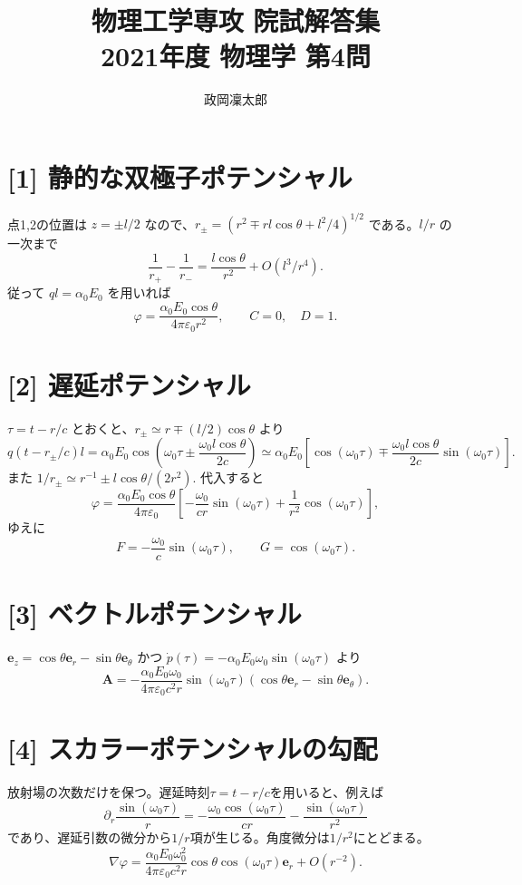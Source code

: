 \documentclass[11pt,a4paper]{article}
\title{物理工学専攻 院試解答集\\2021年度 物理学 第4問}
\author{政岡凜太郎}
\date{}
\begin{document}
\maketitle

\section*{[1] 静的な双極子ポテンシャル}
点1,2の位置は $z=\pm l/2$ なので、$r_\pm=(r^2\mp rl\cos\theta+l^2/4)^{1/2}$ である。$l/r$ の一次まで
\[
\frac1{r_+}-\frac1{r_-}=\frac{l\cos\theta}{r^2}+O(l^3/r^4).
\]
従って $q l=\alpha_0E_0$ を用いれば
\[
\varphi=\frac{\alpha_0E_0\cos\theta}{4\pi\varepsilon_0r^2},\qquad
\boxed{C=0,\quad D=1}.
\]

\section*{[2] 遅延ポテンシャル}
$\tau=t-r/c$ とおくと、$r_\pm\simeq r\mp(l/2)\cos\theta$ より
\[
q(t-r_\pm/c)l=\alpha_0E_0\cos\!\left(\omega_0\tau\pm\frac{\omega_0l\cos\theta}{2c}\right)
\simeq \alpha_0E_0\left[\cos(\omega_0\tau)\mp\frac{\omega_0l\cos\theta}{2c}\sin(\omega_0\tau)\right].
\]
また $1/r_\pm\simeq r^{-1}\pm l\cos\theta/(2r^2)$. 代入すると
\[
\varphi=\frac{\alpha_0E_0\cos\theta}{4\pi\varepsilon_0}
\left[ -\frac{\omega_0}{cr}\sin(\omega_0\tau)+\frac1{r^2}\cos(\omega_0\tau)\right],
\]
ゆえに
\[
\boxed{F=-\frac{\omega_0}{c}\sin(\omega_0\tau),\qquad G=\cos(\omega_0\tau)}.
\]

\section*{[3] ベクトルポテンシャル}
$\boldsymbol e_z=\cos\theta\boldsymbol e_r-\sin\theta\boldsymbol e_\theta$ かつ $\dot p(\tau)=-\alpha_0E_0\omega_0\sin(\omega_0\tau)$ より
\[
\boxed{\boldsymbol A=-\frac{\alpha_0E_0\omega_0}{4\pi\varepsilon_0c^2r}\sin(\omega_0\tau)
(\cos\theta\boldsymbol e_r-\sin\theta\boldsymbol e_\theta)}.
\]

\section*{[4] スカラーポテンシャルの勾配}
放射場の次数だけを保つ。遅延時刻$\tau=t-r/c$を用いると、例えば
\begin{equation}
 \partial_r\frac{\sin(\omega_0\tau)}r
 =-\frac{\omega_0\cos(\omega_0\tau)}{cr}
 -\frac{\sin(\omega_0\tau)}{r^2}
\end{equation}
であり、遅延引数の微分から$1/r$項が生じる。角度微分は$1/r^2$にとどまる。
\[
\boxed{\nabla\varphi=\frac{\alpha_0E_0\omega_0^2}{4\pi\varepsilon_0c^2r}
\cos\theta\cos(\omega_0\tau)\boldsymbol e_r+O(r^{-2})}.
\]
\end{document}
